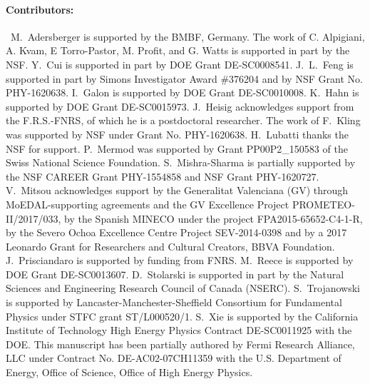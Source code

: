 \paragraph{Contributors:}~M.~Adersberger is supported by the BMBF, Germany. The work of C. Alpigiani, A. Kvam, E Torro-Pastor, M. Profit, and G. Watts is supported in part by the NSF. Y.~Cui is supported in part by DOE Grant DE-SC0008541. J.~L.~Feng is supported in part by Simons Investigator Award \#376204 and by NSF Grant No. PHY-1620638. I.~Galon is supported by DOE Grant DE-SC0010008. K.~Hahn is supported by DOE Grant DE-SC0015973. J.~Heisig acknowledges support from the F.R.S.-FNRS, of which he is a postdoctoral researcher. The work of F.~Kling was supported by NSF under Grant No. PHY-1620638. H.~Lubatti thanks the NSF for support. P.~Mermod was supported by Grant PP00P2\_150583 of the Swiss National Science Foundation. S.~Mishra-Sharma is partially supported by the NSF CAREER Grant PHY-1554858 and NSF Grant PHY-1620727. V.~Mitsou acknowledges support by the Generalitat Valenciana (GV) through MoEDAL-supporting agreements and the GV Excellence Project PROMETEO-II/2017/033, by the Spanish MINECO under the project FPA2015-65652-C4-1-R, by the Severo Ochoa Excellence Centre Project SEV-2014-0398 and by a 2017 Leonardo Grant for Researchers and Cultural Creators, BBVA Foundation. J.~Prisciandaro is supported by funding from FNRS. M.~Reece is supported by DOE Grant DE-SC0013607. D.~Stolarski is supported in part by the Natural Sciences and Engineering Research Council of Canada (NSERC). S.~Trojanowski is supported by Lancaster-Manchester-Sheffield Consortium for Fundamental Physics under STFC grant ST/L000520/1. S.~Xie is supported by the California Institute of Technology High Energy Physics Contract DE-SC0011925 with the DOE. This manuscript has been partially authored by Fermi Research Alliance, LLC under Contract No. DE-AC02-07CH11359 with the U.S. Department of Energy, Office of Science, Office of High Energy Physics.\\



